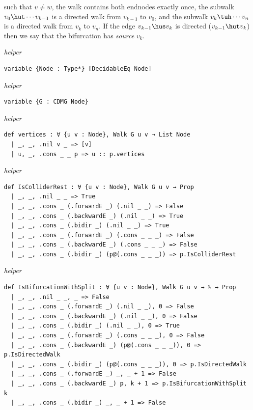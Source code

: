{\begin{enumerate}
        such that $v \ne w$, the walk contains both endnodes exactly once, 
	the subwalk $v_0 \hut \cdots v_{k-1}$ is a directed walk from $v_{k-1}$ to $v_0$,
	and the subwalk $v_k \tuh \cdots v_n$ is a directed walk from $v_k$ to $v_n$.
        If the edge $v_{k-1} \hus v_k$ is directed ($v_{k-1} \hut v_k$) then we say that the bifurcation has \emph{source} $v_{k}$.
  \end{enumerate}
\par}
\smallskip
{\small\textit{helper}}
\begin{verbatim}
variable {Node : Type*} [DecidableEq Node]
\end{verbatim}
{\small\textit{helper}}
\begin{verbatim}
variable {G : CDMG Node}
\end{verbatim}
{\small\textit{helper}}
\begin{verbatim}
def vertices : ∀ {u v : Node}, Walk G u v → List Node
  | _, _, .nil v _ => [v]
  | u, _, .cons _ _ p => u :: p.vertices
\end{verbatim}
{\small\textit{helper}}
\begin{verbatim}
def IsColliderRest : ∀ {u v : Node}, Walk G u v → Prop
  | _, _, .nil _ _ => True
  | _, _, .cons _ (.forwardE _) (.nil _ _) => False
  | _, _, .cons _ (.backwardE _) (.nil _ _) => True
  | _, _, .cons _ (.bidir _) (.nil _ _) => True
  | _, _, .cons _ (.forwardE _) (.cons _ _ _) => False
  | _, _, .cons _ (.backwardE _) (.cons _ _ _) => False
  | _, _, .cons _ (.bidir _) (p@(.cons _ _ _)) => p.IsColliderRest
\end{verbatim}
{\small\textit{helper}}
\begin{verbatim}
def IsBifurcationWithSplit : ∀ {u v : Node}, Walk G u v → ℕ → Prop
  | _, _, .nil _ _, _ => False
  | _, _, .cons _ (.forwardE _) (.nil _ _), 0 => False
  | _, _, .cons _ (.backwardE _) (.nil _ _), 0 => False
  | _, _, .cons _ (.bidir _) (.nil _ _), 0 => True
  | _, _, .cons _ (.forwardE _) (.cons _ _ _), 0 => False
  | _, _, .cons _ (.backwardE _) (p@(.cons _ _ _)), 0 => p.IsDirectedWalk
  | _, _, .cons _ (.bidir _) (p@(.cons _ _ _)), 0 => p.IsDirectedWalk
  | _, _, .cons _ (.forwardE _) _, _ + 1 => False
  | _, _, .cons _ (.backwardE _) p, k + 1 => p.IsBifurcationWithSplit k
  | _, _, .cons _ (.bidir _) _, _ + 1 => False
\end{verbatim}
